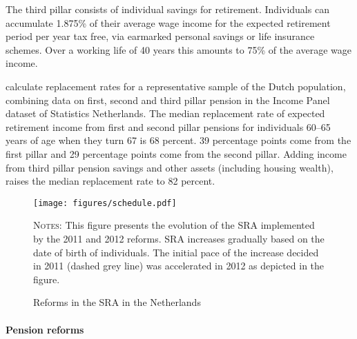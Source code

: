 \documentclass[12pt,a4paper]{article}
\begin{document}
The third pillar consists of individual savings for retirement. Individuals can accumulate 1.875\% of their average wage income for the expected retirement period per year tax free, via earmarked personal savings or life insurance schemes. Over a working life of 40 years this amounts to 75\% of the average wage income. 

\cite{knoef_et_al_2017} calculate replacement rates for a representative sample of the Dutch population, combining data on first, second and third pillar pension in the Income Panel dataset of Statistics Netherlands. The median replacement rate of expected retirement income from first and second pillar pensions for individuals 60--65 years of age when they turn 67 is 68 percent.%
39 percentage points come from the first pillar and 29 percentage points come from the second pillar. Adding income from third pillar pension savings and other assets (including housing wealth), raises the median replacement rate to 82 percent.

\begin{figure}[!t]
\caption{Reforms in the SRA in the Netherlands}
\label{nra_reform}
	\centering
	\texttt{[image: figures/schedule.pdf]}
 	\begin{minipage}{15cm}%
  \footnotesize
	\textsc{Notes:}  This figure presents the evolution of the SRA implemented by the 2011 and 2012 reforms. SRA increases gradually based on the date of birth of individuals. The initial pace of the increase decided in 2011 (dashed grey line) was accelerated in 2012 as depicted in the figure.
	\end{minipage}%
\end{figure}

\paragraph{Pension reforms}
\end{document}
